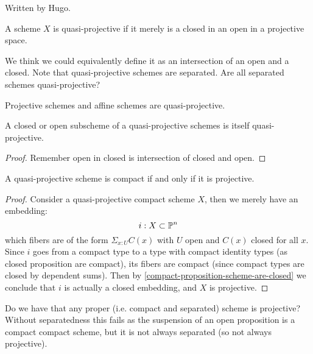 Written by Hugo.

\begin{definition}
A scheme $X$ is quasi-projective if it merely is a closed in an open in a projective space. 
\end{definition}

We think we could equivalently define it as an intersection of an open and a closed. Note that quasi-projective schemes are separated. Are all separated schemes quasi-projective?

\begin{lemma}
Projective schemes and affine schemes are quasi-projective.
\end{lemma}

\begin{lemma}
A closed or open subscheme of a quasi-projective schemes is itself quasi-projective.
\end{lemma}

\begin{proof}
Remember open in closed is intersection of closed and open.
\end{proof}

\begin{proposition}
A quasi-projective scheme is compact if and only if it is projective.
\end{proposition}

\begin{proof}
Consider a quasi-projective compact scheme $X$, then we merely have an embedding:
\[i: X\subset \mathbb{P}^n\]
which fibers are of the form $\Sigma_{x:U}C(x)$ with $U$ open and $C(x)$ closed for all $x$. Since $i$ goes from a compact type to a type with compact identity types (as closed proposition are compact), its fibers are compact (since compact types are closed by dependent sums). Then by \cref{compact-proposition-scheme-are-closed} we conclude that $i$ is actually a closed embedding, and $X$ is projective.
\end{proof}

Do we have that any proper (i.e. compact and separated) scheme is projective? Without separatedness this fails as the suspension of an open proposition is a compact compact scheme, but it is not always separated (so not always projective). 


